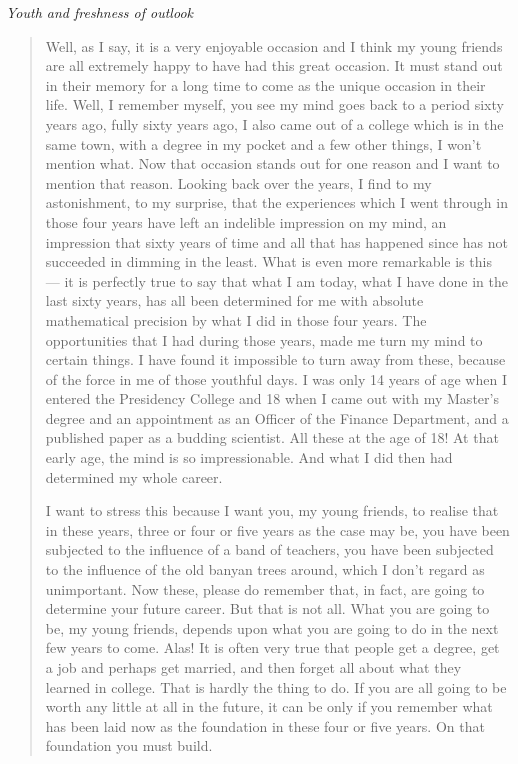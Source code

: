 \medskip
\noindent
{\em Youth and freshness of outlook}
\begin{quote}
{\fontsize{10pt}{12pt}\selectfont
Well, as I say, it is a very enjoyable occasion and I think my young friends are all extremely happy to have had this great occasion. It must stand out in their memory for a long time to come as the unique occasion in their life. Well, I remember myself, you see my mind goes back to a period sixty years ago, fully sixty years ago, I also came out of a college which is in the same town, with a degree in my pocket and a few other things, I won't mention what. Now that occasion stands out for one reason and I want to mention that reason. Looking back over the years, I find to my astonishment, to my surprise, that the experiences which I went through in those four years have left an indelible impression on my mind, an impression that sixty years of time and all that has happened since has not succeeded in dimming in the least. What is even more remarkable is this --- it is perfectly true to say that what I am today, what I have done in the last sixty years, has all been determined for me with absolute mathematical precision by what I did in those four years. The opportunities that I had during those years, made me turn my mind to certain things. I have found it impossible to turn away from these, because of the force in me of those youthful days. I was only 14 years of age when I entered the Presidency College and 18 when I came out with my Master's degree and an appointment as an Officer of the Finance Department, and a published paper as a budding scientist. All these at the age of 18! At that early age, the mind is so impressionable. And what I did then had determined my whole career.

I want to stress this because I want you, my young friends, to realise that in these years, three or four or five years as the case may be, you have been subjected to the influence of a band of teachers, you have been subjected to the influence of the old banyan trees around, which I don't regard as unimportant. Now these, please do remember that, in fact, are going to determine your future career. But that is not all. What you are going to be, my young friends, depends upon what you are going to do in the next few years to come. Alas! It is often very true that people get a degree, get a job and perhaps get married, and then forget all about what they learned in college. That is hardly the thing to do. If you are all going to be worth any little at all in the future, it can be only if you remember what has been laid now as the foundation in these four or five years. On that foundation you must build.

}
\end{quote}
